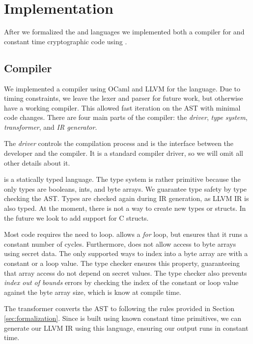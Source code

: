 \section{Implementation}
\label{sec:implementation}

After we formalized the \constc and \ccore languages we implemented both a compiler for \constc and constant time cryptographic code using \constc.

\subsection{\constc Compiler}
We implemented a compiler using OCaml and LLVM for the \constc language. Due to timing constraints, we leave the lexer and parser for future work, but otherwise have a working compiler. This allowed fast iteration on the AST with minimal code changes. There are four main parts of the \constc compiler: the \textit{driver}, \textit{type system}, \textit{transformer}, and \textit{IR generator}.

 The \textit{driver} controls the compilation process and is the interface between the developer and the compiler. It is a standard compiler driver, so we will omit all other details about it.

 \constc is a statically typed language. The type system is rather primitive because the only types are booleans, ints, and byte arrays. We guarantee type safety by type checking the \constc AST. Types are checked again during IR generation, as LLVM IR is also typed. At the moment, there is not a way to create new types or structs. In the future we look to add support for C structs.

Most code requires the need to loop. \constc allows a \textit{for} loop, but ensures that it runs a constant number of cycles. Furthermore, \constc does not allow access to byte arrays using secret data. The only supported ways to index into a byte array are with a constant or a loop value. The type checker ensures this property, guaranteeing that array access do not depend on secret values. The type checker also prevents \textit{index out of bounds} errors by checking the index of the constant or loop value against the byte array size, which is know at compile time.

 The transformer converts the \constc AST to \ccore following the rules provided in Section \ref{sec:formalization}. Since \ccore is built using known constant time primitives, we can generate our LLVM IR using this language, ensuring our output runs in constant time.


